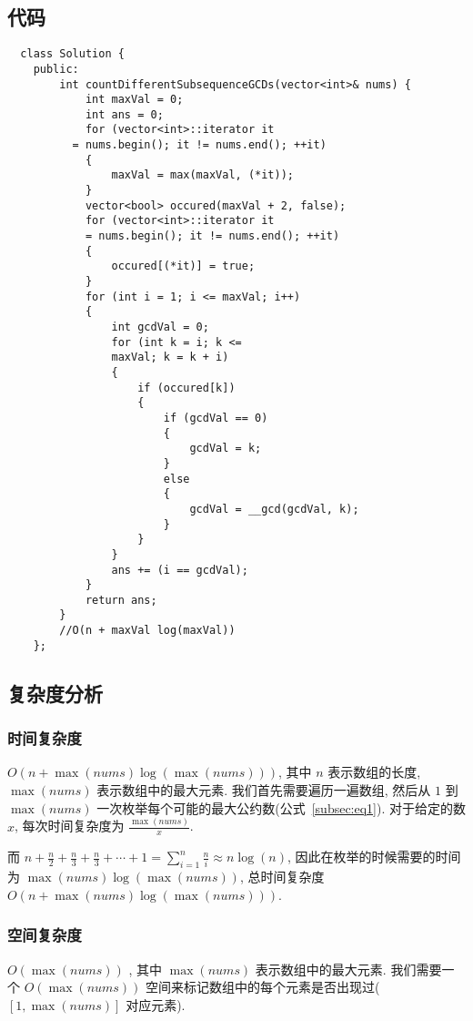 \documentclass[12pt]{ctexart}
\begin{document}
\subsection{代码}
\begin{verbatim}
  class Solution {
    public:
        int countDifferentSubsequenceGCDs(vector<int>& nums) {
            int maxVal = 0;
            int ans = 0;
            for (vector<int>::iterator it
          = nums.begin(); it != nums.end(); ++it)
            {
                maxVal = max(maxVal, (*it));
            }
            vector<bool> occured(maxVal + 2, false);
            for (vector<int>::iterator it 
            = nums.begin(); it != nums.end(); ++it)
            {
                occured[(*it)] = true;
            }
            for (int i = 1; i <= maxVal; i++)
            {
                int gcdVal = 0;
                for (int k = i; k <= 
                maxVal; k = k + i)
                {
                    if (occured[k])
                    {
                        if (gcdVal == 0)
                        { 
                            gcdVal = k;
                        }
                        else
                        {
                            gcdVal = __gcd(gcdVal, k);
                        }
                    }
                }
                ans += (i == gcdVal);
            }
            return ans;
        }
        //O(n + maxVal log(maxVal))
    };
\end{verbatim}

\subsection{复杂度分析}
\subsubsection{时间复杂度}
$O(n + \max(nums)\log(\max(nums)))$, 其中 $n$ 表示数组的长度, $\max(nums)$ 表示数组中的最大元素. 我们首先需要遍历一遍数组, 然后从 $1$ 到 $\max(nums)$ 一次枚举每个可能的最大公约数(公式~\eqref{subsec:eq1}). 对于给定的数 $x$, 每次时间复杂度为 $\displaystyle \frac{\max(nums)}{x}$.

而 $\displaystyle n + \frac{n}{2} + \frac{n}{3} + \frac{n}{3} + \cdots + 1 = \sum_{i = 1}^{n} \frac{n}{i} \approx n\log(n)$, 因此在枚举的时候需要的时间为 $\max(nums)\log(\max(nums))$, 总时间复杂度 $O(n + \max(nums)\log(\max(nums)))$.

\subsubsection{空间复杂度}
$O(\max(nums))$ , 其中 $\max(nums)$ 表示数组中的最大元素. 我们需要一个 $O(\max(nums))$ 空间来标记数组中的每个元素是否出现过($[1, \max(nums)]$ 对应元素).
\end{document}
